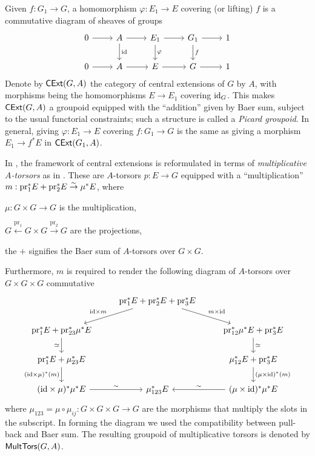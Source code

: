 \documentclass[12pt, a3paper, openany]{book}
\begin{document}
Given $f: G_1 \to G$, a homomorphism $\varphi: E_1 \to E$ covering (or lifting) $f$ is a commutative diagram of sheaves of groups
\[\begin{tikzcd}
	0 \arrow{r} & A \arrow{r} \arrow{d}[right]{\identity} & E_1 \arrow{r} \arrow{d}[right]{\varphi} & G_1 \arrow{d}[right]{f} \arrow{r} & 1 \\
	0 \arrow{r} & A \arrow{r} & E \arrow{r} & G \arrow{r} & 1
\end{tikzcd}\]
Denote by $\mathsf{CExt}(G,A)$ the category of central extensions of $G$ by $A$, with morphisms being the homomorphisms $E \to E_1$ covering $\mathrm{id}_G$. This makes $\mathsf{CExt}(G, A)$ a groupoid equipped with the ``addition'' given by Baer sum, subject to the usual functorial constraints; such a structure is called a \emph{Picard groupoid}. In general, giving $\varphi: E_1 \to E$ covering $f: G_1 \to G$ is the same as giving a morphism $E_1 \to f^* E$ in $\mathsf{CExt}(G_1, A)$.

In \cite{BD01}, the framework of central extensions is reformulated in terms of \emph{multiplicative $A$-torsors} as in \cite[Exp VII]{SGA7-1}. These are $A$-torsors $p: E \to G$ equipped with a ``multiplication'' $m: \text{pr}_1^* E + \text{pr}^*_2 E \stackrel{\sim}{\rightarrow} \mu^* E$, where
\begin{compactitem}
	\item $\mu: G \times G \to G$ is the multiplication,
	\item $G \xleftarrow{\text{pr}_1} G \times G \xrightarrow{\text{pr}_2} G$ are the projections,
	\item the $+$ signifies the Baer sum of $A$-torsors over $G \times G$.
\end{compactitem}
Furthermore, $m$ is required to render the following diagram of $A$-torsors over $G \times G \times G$ commutative
\[\begin{tikzcd}
	& \text{pr}_1^* E + \text{pr}_2^* E + \text{pr}_3^* E \arrow{rd}{m \times \identity} \arrow{ld}[swap]{\identity \times m} & \\
	\text{pr}_1^* E + \text{pr}_{23}^* \mu^* E \arrow{d}[swap]{\simeq} & & \text{pr}_{12}^* \mu^* E + \text{pr}_3^* E \arrow{d}{\simeq} \\
	\text{pr}_1^* E + \mu_{23}^* E \arrow{d}[swap]{(\identity \times \mu)^*(m)} & & \mu_{12}^* E + \text{pr}_3^* E \arrow{d}{(\mu \times \identity)^*(m)} \\
	(\identity \times \mu)^* \mu^* E \arrow{r}[above]{\sim} & \mu_{123}^* E & (\mu \times \identity)^* \mu^* E \arrow{l}[above]{\sim}
\end{tikzcd}\]
where $\mu_{123} = \mu \circ \mu_{ij}: G \times G \times G \to G$ are the morphisms that multiply the slots in the subscript. In forming the diagram we used the compatibility between pull-back and Baer sum. The resulting groupoid of multiplicative torsors is denoted by $\mathsf{MultTors}(G,A)$.
\end{document}
